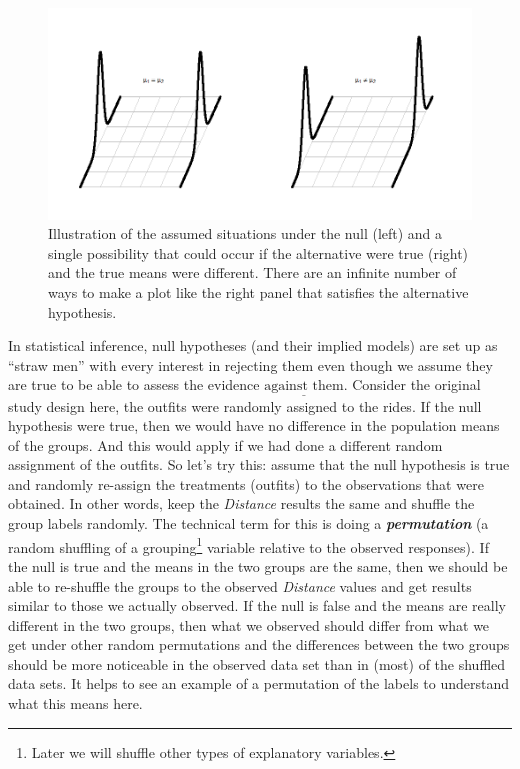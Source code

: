 \documentclass[
]{book}
\begin{document}
\begin{figure}[ht!]

{\centering \includegraphics[width=1\linewidth]{chapter2_files/image015} 

}

\caption{Illustration of the assumed situations under the null (left) and a single possibility that could occur if the alternative were true (right) and the true means were different. There are an infinite number of ways to make a plot like the right panel that satisfies the alternative hypothesis.}\label{fig:Figure2-6}
\end{figure}

\indent In statistical inference, null hypotheses (and their
implied models) are set
up as ``straw men'' with every interest in rejecting them even though we assume
they are true to be able to assess the evidence \(\underline{\text{against them}}\).
Consider the original study design here, the outfits were randomly assigned to
the rides. If the null hypothesis were true, then we would have no difference
in the population means of the groups. And this would apply if we had done a
different random assignment  of the outfits. So let's try this:
assume that the null hypothesis is true and randomly re-assign the treatments
(outfits) to the observations that were obtained. In other words, keep the
\emph{Distance} results the same and shuffle the group labels randomly. The
technical term for this is doing a \textbf{\emph{permutation}}  (a random shuffling of
a grouping\footnote{Later we will shuffle other types of explanatory variables.} variable relative to the observed responses). If the null is true
and the means
in the two groups are the same, then we should be able to re-shuffle the
groups to the observed \emph{Distance} values and get results similar to those we
actually observed. If the null is false and the means are really different in
the two groups, then what we observed should differ from what we get under
other random permutations and the differences between the two groups should be
more noticeable in the observed data set than in (most) of the shuffled data
sets. It helps to see an example of a permutation of the labels to understand
what this means here.
\end{document}
